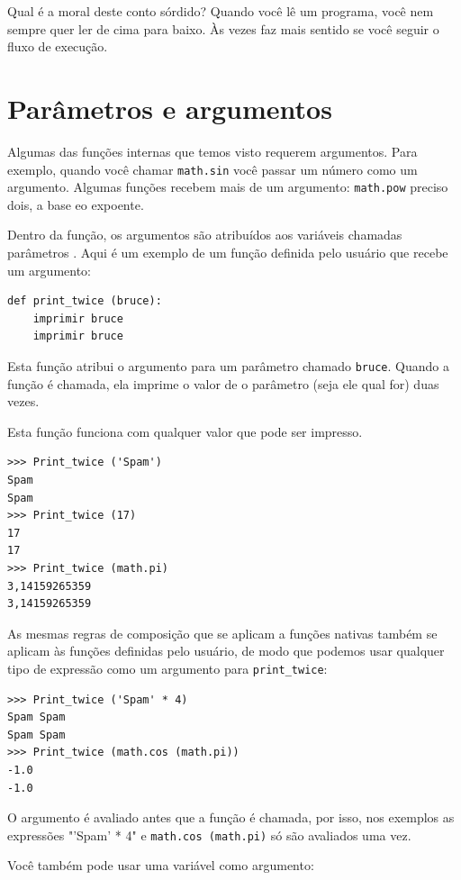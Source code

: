 \documentclass[10pt]{book}
\begin{document}
\begin{exercise}
Qual é a moral deste conto sórdido? Quando você lê um programa, você
nem sempre quer ler de cima para baixo. Às vezes faz
mais sentido se você seguir o fluxo de execução.


\section{Parâmetros e argumentos}
\label{parâmetros}

Algumas das funções internas que temos visto requerem argumentos. Para
exemplo, quando você chamar {\tt math.sin} você passar um número
como um argumento. Algumas funções recebem mais de um argumento:
{\tt math.pow} preciso dois, a base eo expoente.

Dentro da função, os argumentos são atribuídos aos
variáveis ​​chamadas parâmetros {\bf}. Aqui é um exemplo de um
função definida pelo usuário que recebe um argumento:

\begin{verbatim}
def print_twice (bruce):
    imprimir bruce
    imprimir bruce
\end{verbatim}
%
Esta função atribui o argumento para um parâmetro
chamado {\tt bruce}. Quando a função é chamada, ela imprime o valor de
o parâmetro (seja ele qual for) duas vezes.

Esta função funciona com qualquer valor que pode ser impresso.

\begin{verbatim}
>>> Print_twice ('Spam')
Spam
Spam
>>> Print_twice (17)
17
17
>>> Print_twice (math.pi)
3,14159265359
3,14159265359
\end{verbatim}
%
As mesmas regras de composição que se aplicam a funções nativas também
se aplicam às funções definidas pelo usuário, de modo que podemos usar qualquer tipo de expressão
como um argumento para \verb "print_twice":

\begin{verbatim}
>>> Print_twice ('Spam' * 4)
Spam Spam
Spam Spam
>>> Print_twice (math.cos (math.pi))
-1.0
-1.0
\end{verbatim}
%
O argumento é avaliado antes que a função é chamada, por isso,
nos exemplos as expressões \verbo "'Spam' * 4" e
{\tt math.cos (math.pi)} só são avaliados uma vez.

Você também pode usar uma variável como argumento:


\end{exercise}
\end{document}
